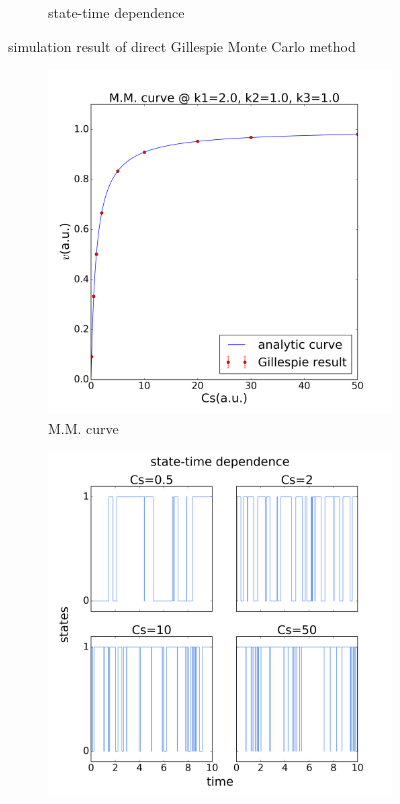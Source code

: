 \begin{figure}[H]
\begin{subfigure}{0.46\textwidth}
		\caption{state-time dependence}
		\end{subfigure}
		\caption{simulation result of direct Gillespie Monte Carlo method}
		\label{img:direct_result}
	\end{figure}

	\begin{figure}[H]
		\centering
		\begin{subfigure}{0.46\textwidth}
		\includegraphics[scale=0.33]{img/MM2.png}
		\caption{M.M. curve}
		\end{subfigure}
		\begin{subfigure}{0.46\textwidth}
		\includegraphics[scale=0.33]{img/state2.png}

\end{subfigure}
\end{figure}
